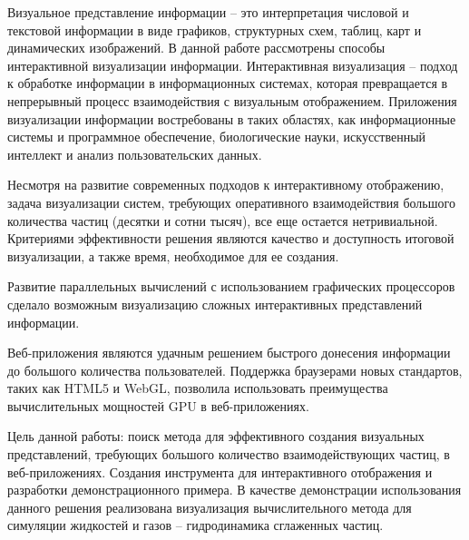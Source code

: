\newpage
{}

Визуальное представление информации -- это интерпретация числовой и текстовой
информации в виде графиков, структурных схем, таблиц, карт и динамических изображений.
В данной работе рассмотрены способы интерактивной визуализации информации.
Интерактивная визуализация -- подход к обработке информации в информационных 
системах, которая превращается в непрерывный процесс взаимодействия с 
визуальным отображением. Приложения визуализации информации востребованы в таких 
областях, как информационные системы и программное обеспечение, биологические 
науки, искусственный интеллект и анализ пользовательских данных.

Несмотря на развитие современных подходов к интерактивному отображению, задача
визуализации систем, требующих оперативного взаимодействия большого количества
частиц (десятки и сотни тысяч), все еще остается нетривиальной. Критериями 
эффективности решения являются качество и доступность итоговой визуализации, 
а также время, необходимое для ее создания.

Развитие параллельных вычислений с использованием графических процессоров сделало 
возможным визуализацию сложных интерактивных представлений информации. 

Веб-приложения являются удачным решением быстрого донесения информации до большого
количества пользователей. Поддержка браузерами новых стандартов, таких как HTML5 и WebGL,  
позволила использовать преимущества вычислительных мощностей GPU в веб-приложениях.

Цель данной работы: поиск метода для эффективного создания визуальных представлений,
требующих большого количество взаимодействующих частиц,
в веб-приложениях. Создания инструмента для интерактивного отображения и разработки
демонстрационного примера. В качестве демонстрации использования данного решения реализована 
визуализация вычислительного метода для симуляции жидкостей и газов -- гидродинамика 
сглаженных частиц.


